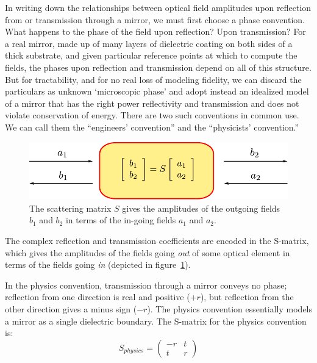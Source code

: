 In writing down the relationships between optical field amplitudes
upon reflection from or transmission through a mirror, we must first
choose a phase convention. What happens to the phase of the field upon
reflection? Upon transmission? For a real mirror, made up of many
layers of dielectric coating on both sides of a thick substrate, and
given particular reference points at which to compute the fields, the
phases upon reflection and transmission depend on all of this
structure. But for tractability, and for no real loss of modeling
fidelity, we can discard the particulars as unknown `microscopic
phase' and adopt instead an idealized model of a mirror that has the
right power reflectivity and transmission and does not violate
conservation of energy. There are two such conventions in common
use. We can call them the ``engineers' convention'' and the
``physicists' convention.''

\begin{figure}
\centerline{\includegraphics{figures/Smatrix.pdf}}
\caption[Scattering matrix]{\label{fig:Smatrix}The scattering matrix $S$ 
gives the amplitudes of the outgoing fields $b_1$ and $b_2$ in terms of
the in-going fields $a_1$ and $a_2$.}
\end{figure}

The complex reflection and transmission coefficients are encoded in
the S-matrix, which gives the amplitudes of the fields going
\emph{out} of some optical element in terms of the fields going
\emph{in} (depicted in figure~\ref{fig:Smatrix}).

In the physics convention, transmission through a mirror conveys no
phase; reflection from one direction is real and positive ($+r$),
but reflection from the other direction gives a minus sign ($-r$).
The physics convention essentially models a mirror as a single dielectric
boundary.  The S-matrix for the physics convention is:
%
\begin{equation}
S_{physics}=\left(\begin{array}{cc}
-r & t\\
 t & r
\end{array}\right)
\label{eq:Smatrix-physics}
\end{equation}

